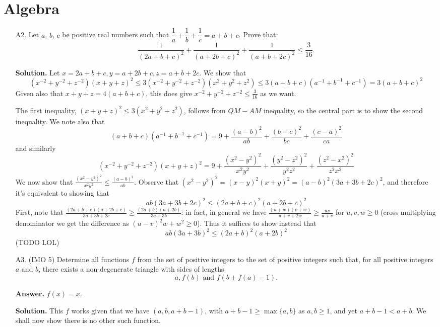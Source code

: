 \documentclass[11pt,a4paper]{article}
\begin{document}
	\section*{Algebra}
	\begin{enumerate}
		\item [A2.] 
		Let $a$, $b$, $c$ be positive real numbers such that $\dfrac{1}{a} + \dfrac{1}{b} + \dfrac{1}{c} = a+b+c$. Prove that:
		\[\frac{1}{(2a+b+c)^2}+\frac{1}{(a+2b+c)^2}+\frac{1}{(a+b+2c)^2}\leq \frac{3}{16}.\]
		
		\textbf{Solution.} 
		Let $x = 2a+b+c, y = a+2b+c, z = a+b+2c$. 
		We show that 
		\[
		(x^{-2} + y^{-2} + z^{-2})(x+y+z)^2
		\le 3(x^{-2} + y^{-2} + z^{-2})(x^2+y^2+z^2)
		\le 3(a + b + c)(a^{-1} + b^{-1}+c^{-1})
		=3(a + b + c)^2
		\]
		Given also that $x + y + z = 4(a + b + c)$, this does give $x^{-2} + y^{-2} + z^{-2}\le \frac{3}{16}$ as we want. 
		
		The first inequality, $(x+y+z)^2\le 3(x^2+y^2+z^2)$, 
		follows from $QM-AM$ inequality, so the central part is to show the second inequality. 
		We note also that 
		\[
		(a + b + c)(a^{-1} + b^{-1}+c^{-1})
		= 9 +\frac{(a - b)^2}{ab} + \frac{(b - c)^2}{bc} + \frac{(c - a)^2}{ca}
		\]
		and similarly 
		\[
		(x^{-2} + y^{-2} + z^{-2})(x+y+z)^2
		= 9 + \frac{(x^2 - y^2)^2}{x^2y^2} + \frac{(y^2 - z^2)^2}{y^2z^2} + \frac{(z^2 -x^2)^2}{z^2x^2}
		\]
		We now show that $\frac{(x^2 - y^2)^2}{x^2y^2}\le \frac{(a - b)^2}{ab}$. 
		Observe that $(x^2 - y^2)^2 = (x - y)^2(x + y)^2 = (a - b)^2(3a + 3b + 2c)^2$, 
		and therefore it's equivalent to showing that 
		\[
		ab(3a + 3b + 2c)^2\le (2a + b + c)^2(a + 2b + c)^2
		\]
		First, note that $\frac{(2a + b + c)(a + 2b + c)}{3a + 3b + 2c}\ge \frac{(2a + b)(a + 2b)}{3a + 3b}$: 
		in fact, 
		in general we have $\frac{(u + w)(v + w)}{u + v + 2w}\ge \frac{uv}{u + v}$ for $u, v, w\ge 0$
		(cross multiplying denominator we get the difference as $(u-v)^2w + w^2\ge 0$). 
		Thus it suffices to show instead that 
		\[
		ab(3a + 3b)^2\le (2a + b)^2(a + 2b)^2
		\]
		(TODO LOL)
		
		\item [A3.] (IMO 5)
		Determine all functions $ f$ from the set of positive integers to the set of positive integers such that, for all positive integers $ a$ and $ b$, there exists a non-degenerate triangle with sides of lengths
		\[ a, f(b) \text{ and } f(b + f(a) - 1).\]
		
		\textbf{Answer.} $f(x) = x$. 
		
		\textbf{Solution.} 
		This $f$ works given that we have $(a, b, a+b-1)$, with $a+b-1\ge \max\{a, b\}$ as $a, b\ge 1$, 
		and yet $a+b-1 < a + b$. 
		We shall now show there is no other such function. 
		

\end{enumerate}
\end{document}
